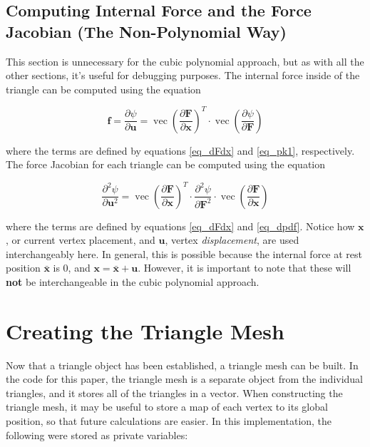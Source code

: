 \documentclass[twocolumn,10pt]{asme2ej}
\DeclareMathOperator{\vect}{vec}
\begin{document}
\subsection{Computing Internal Force and the Force Jacobian (The Non-Polynomial Way)}

This section is unnecessary for the cubic polynomial approach, but as with all the other sections, it's useful for debugging purposes. The internal force inside of the triangle can be computed using the equation

\begin{equation}
\bm{f} = \frac{\partial \psi}{\partial \bm{u}} = \vect \left(\frac{\partial \bm{F}}{\partial \bm{x}}\right)^T\cdot \vect \left(\frac{\partial \psi}{\partial \bm{F}}\right)
\label{eq_triforce}
\end{equation}

\noindent where the terms are defined by equations \ref{eq_dFdx} and \ref{eq_pk1}, respectively. The force Jacobian for each triangle can be computed using the equation

\begin{equation}
\frac{\partial^2 \psi}{\partial \bm{u}^2} = \vect \left(\frac{\partial \bm{F}}{\partial \bm{x}}\right)^T\cdot \frac{\partial^2 \psi}{\partial \bm{F}^2}\cdot \vect \left(\frac{\partial \bm{F}}{\partial \bm{x}}\right)
\label{eq_trijacob}
\end{equation}

\noindent where the terms are defined by equations \ref{eq_dFdx} and \ref{eq_dpdf}. Notice how $\bm{x}$, or current vertex placement, and $\bm{u}$, vertex \textit{displacement}, are used interchangeably here. In general, this is possible because the internal force at rest position $\bm{\bar{x}}$ is $0$, and $\bm{x} = \bm{\bar{x}} + \bm{u}$. However, it is important to note that these will \textbf{not} be interchangeable in the cubic polynomial approach.


\section{Creating the Triangle Mesh}

Now that a triangle object has been established, a triangle mesh can be built. In the code for this paper, the triangle mesh is a separate object from the individual triangles, and it stores all of the triangles in a vector. When constructing the triangle mesh, it may be useful to store a map of each vertex to its global position, so that future calculations are easier. In this implementation, the following were stored as private variables:
\end{document}
